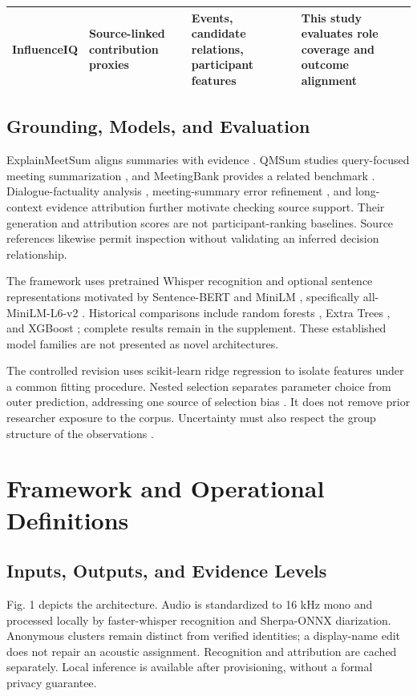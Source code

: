 \documentclass[journal]{IEEEtran}
\begin{document}
\begin{table}[t]
\begin{tabular}{p{}p{}p{}p{}}
{\raggedright InfluenceIQ\par} & {\raggedright Source-linked contribution proxies\par} & {\raggedright Events, candidate relations, participant features\par} & {\raggedright This study evaluates role coverage and outcome alignment\par} \\
\bottomrule
\end{tabular}
\end{table}
\subsection{Grounding, Models, and Evaluation}
ExplainMeetSum aligns summaries with evidence \cite{ref8}. QMSum studies query-focused meeting summarization \cite{ref9}, and MeetingBank provides a related benchmark \cite{ref10}. Dialogue-factuality analysis \cite{ref11}, meeting-summary error refinement \cite{ref12}, and long-context evidence attribution \cite{ref13} further motivate checking source support. Their generation and attribution scores are not participant-ranking baselines. Source references likewise permit inspection without validating an inferred decision relationship.

The framework uses pretrained Whisper recognition \cite{ref14} and optional sentence representations motivated by Sentence-BERT \cite{ref15} and MiniLM \cite{ref16}, specifically all-MiniLM-L6-v2 \cite{ref17}. Historical comparisons include random forests \cite{ref18}, Extra Trees \cite{ref19}, and XGBoost \cite{ref20}; complete results remain in the supplement. These established model families are not presented as novel architectures.

The controlled revision uses scikit-learn ridge regression \cite{ref21} to isolate features under a common fitting procedure. Nested selection separates parameter choice from outer prediction, addressing one source of selection bias \cite{ref22}. It does not remove prior researcher exposure to the corpus. Uncertainty must also respect the group structure of the observations \cite{ref23}.

\section{Framework and Operational Definitions}
\subsection{Inputs, Outputs, and Evidence Levels}
Fig. 1 depicts the architecture. Audio is standardized to 16 kHz mono and processed locally by faster-whisper recognition and Sherpa-ONNX diarization. Anonymous clusters remain distinct from verified identities; a display-name edit does not repair an acoustic assignment. Recognition and attribution are cached separately. Local inference is available after provisioning, without a formal privacy guarantee.
\end{document}
